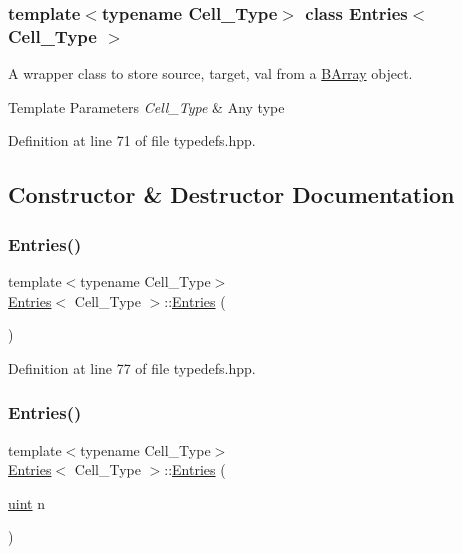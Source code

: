 \subsubsection*{template$<$typename Cell\+\_\+\+Type$>$\newline
class Entries$<$ Cell\+\_\+\+Type $>$}

A wrapper class to store {\ttfamily source}, {\ttfamily target}, {\ttfamily val} from a {\ttfamily \hyperlink{class_b_array}{B\+Array}} object. 


\begin{DoxyTemplParams}{Template Parameters}
{\em Cell\+\_\+\+Type} & Any type \\
\hline
\end{DoxyTemplParams}


Definition at line 71 of file typedefs.\+hpp.



\subsection{Constructor \& Destructor Documentation}
\mbox{\label{class_entries_a9e6cba5965f285beb3c0356c79f592d2}} 
\subsubsection{\texorpdfstring{Entries()}{Entries()}\hspace{0.1cm}{\footnotesize\ttfamily [1/2]}}
{\footnotesize\ttfamily template$<$typename Cell\+\_\+\+Type$>$ \\
\hyperlink{class_entries}{Entries}$<$ Cell\+\_\+\+Type $>$\+::\hyperlink{class_entries}{Entries} (\begin{DoxyParamCaption}{ }\end{DoxyParamCaption})\hspace{0.3cm}{\ttfamily [inline]}}



Definition at line 77 of file typedefs.\+hpp.

\mbox{\label{class_entries_a03249234a765e3363ae89dba76b3ff9f}} 
\subsubsection{\texorpdfstring{Entries()}{Entries()}\hspace{0.1cm}{\footnotesize\ttfamily [2/2]}}
{\footnotesize\ttfamily template$<$typename Cell\+\_\+\+Type$>$ \\
\hyperlink{class_entries}{Entries}$<$ Cell\+\_\+\+Type $>$\+::\hyperlink{class_entries}{Entries} (\begin{DoxyParamCaption}\item[{\hyperlink{typedefs_8hpp_a91ad9478d81a7aaf2593e8d9c3d06a14}{uint}}]{n }\end{DoxyParamCaption})\hspace{0.3cm}{\ttfamily [inline]}}



